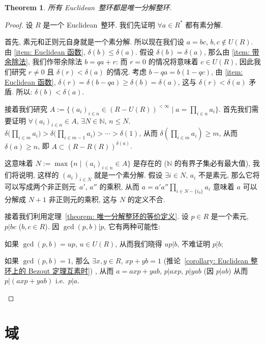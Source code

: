 \documentclass[openany]{ctexbook}
\theoremstyle{plain}
\newtheorem{theorem}{Theorem}[section] %
\theoremstyle{definition}
\begin{document}
\begin{theorem}\label{theorem: Euclidean 整环是唯一分解的}
	所有 Euclidean~整环都是唯一分解整环.
\end{theorem}
\begin{proof}
	设 $R$ 是一个 Euclidean~整环. 我们先证明 $\forall a \in R^*$ 都有素分解. 
	
	首先, 素元和正则元自身就是一个素分解. 
	所以现在我们设 $a = bc$, $b, c \notin U(R)$. 
	由 \ref{item: Euclidean 函数}, $\delta(b) \leq \delta(a) $. 
	假设 $\delta(b) = \delta(a)$, 那么由 \ref{item: 带余除法}, 我们作带余除法 $b = qa + r$: 而 $r = 0$ 的情况将意味着 $c \in U(R)$, 因此我们研究 $r \neq 0$ 且 $\delta(r) < \delta(a)$ 的情况. 考虑 $b - qa = b(1 - qc)$, 由 \ref{item: Euclidean 函数}, $\delta(r) = \delta(b - qa) \geq \delta(b) = \delta(a)$, 这与 $\delta(r) < \delta(a)$ 矛盾. 
	所以: $\delta(b) < \delta(a)$.

	接着我们研究 $A := \{(a_i)_{i \in n} \in (R - U(R))^{< \infty} \mid a = \prod_{i \in n} a_i\}$. 
	首先我们需要证明 $\forall (a_i)_{i \in n} \in A$, $\exists N \in \mathbb N$, $n \leq N$. 
	$\delta \big(\prod_{i \in m} a_i) > \delta\big(\prod_{i \in m - 1} a_i) > \cdots > \delta(1)$, 从而 $\delta(\prod_{i \in m} a_i) \geq m$, 从而 $\delta(a) \geq n$, 即 $A \subset (R - R(R))^{\delta(a)}$. 
	
	这意味着 $N := \max\{n \mid (a_i)_{i \in n} \in A\}$ 是存在的 ($\mathbb N$ 的有界子集必有最大值), 我们将说明, 这样的 $(a_i)_{i \in N}$ 就是一个素分解. 
	假设 $\exists i \in N$, $a_i$ 不是素元, 那么它将可以写成两个非正则元~$a'$, $a''$ 的乘积, 从而 $a = a' a''\prod_{i \in N - \{i_0\}} a_i$ 意味着 $a$ 可以分解成 $N + 1$ 非正则元的乘积, 这与 $N$ 的定义不合.

	接着我们利用定理~\ref{theorem: 唯一分解整环的等价定义}. 
	设 $p \in R$ 是一个素元, $p | bc$ ($b, c \in R$). 因 $\gcd(p, b) | p$, 它有两种可能性: 
	\begin{conditionlist}[label = \roman*)]
		\item 如果 $\gcd(p, b) = up$, $u \in U(R)$, 从而我们晓得 $up | b$, 不难证明 $p |b$; 
		\item 如果 $\gcd(p, b) = 1$, 那么 $\exists x, y \in R$, $xp + yb = 1$ 
			(推论~\ref{corollary: Euclidean 整环上的 Bezout 定理互素时})%
		, 从而 $a = axp + yab$, $p | axp$, $p | yab$ (因 $p | ab$) 从而 $p | (axp + yab)$ i.e.\ $p | a$. 
	\end{conditionlist}
\end{proof}

\section{域}
\end{document}
